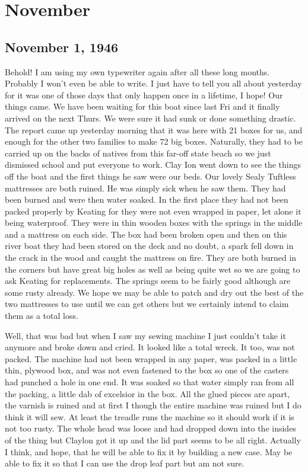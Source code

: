 \documentclass[
]{book}
\begin{document}
\hypertarget{november}{%
\section{November}\label{november}}

\hypertarget{november-1-1946}{%
\subsection{November 1, 1946}\label{november-1-1946}}

Behold! I am using my own typewriter again after all these long months. Probably I won't even be able to write. I just have to tell you all about yesterday for it was one of those days that only happen once in a lifetime, I hope! Our things came. We have been waiting for this boat since last Fri and it finally arrived on the next Thurs. We were sure it had sunk or done something drastic. The report came up yesterday morning that it was here with 21 boxes for us, and enough for the other two families to make 72 big boxes. Naturally, they had to be carried up on the backs of natives from this far-off state beach so we just dismissed school and put everyone to work. Clay Ion went down to see the things off the boat and the first things he saw were our beds. Our lovely Sealy Tuftless mattresses are both ruined. He was simply sick when he saw them. They had been burned and were then water soaked. In the first place they had not been packed properly by Keating for they were not even wrapped in paper, let alone it being waterproof. They were in thin wooden boxes with the springs in the middle and a mattress on each side. The box had been broken open and then on this river boat they had been stored on the deck and no doubt, a spark fell down in the crack in the wood and caught the mattress on fire. They are both burned in the corners but have great big holes as well as being quite wet so we are going to ask Keating for replacements. The springs seem to be fairly good although are some rusty already. We hope we may be able to patch and dry out the best of the two mattresses to use until we can get others but we certainly intend to claim them as a total loss.

Well, that was bad but when I saw my sewing machine I just couldn't take it anymore and broke down and cried. It looked like a total wreck. It too, was not packed. The machine had not been wrapped in any paper, was packed in a little thin, plywood box, and was not even fastened to the box so one of the casters had punched a hole in one end. It was soaked so that water simply ran from all the packing, a little dab of excelsior in the box. All the glued pieces are apart, the varnish is ruined and at first I though the entire machine was ruined but I do think it will sew. At least the treadle runs the machine so it should work if it is not too rusty. The whole head was loose and had dropped down into the insides of the thing but Claylon got it up and the lid part seems to be all right. Actually I think, and hope, that he will be able to fix it by building a new case. May be able to fix it so that I can use the drop leaf part but am not sure.
\end{document}
